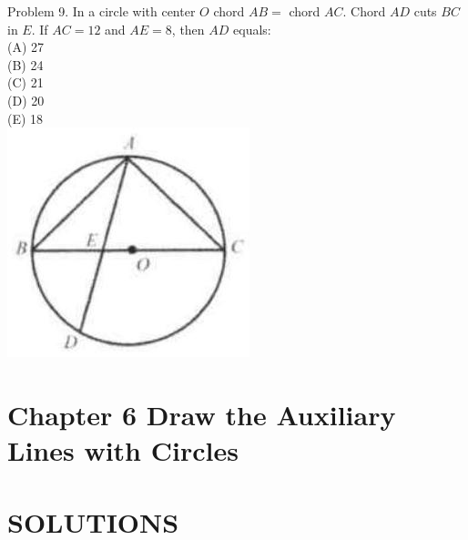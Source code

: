 \documentclass[10pt]{article}
\begin{document}
Problem 9. In a circle with center \(O\) chord \(A B=\) chord \(A C\). Chord \(A D\) cuts \(B C\) in \(E\). If \(A C=12\) and \(A E=8\), then \(A D\) equals:\\
(A) 27\\
(B) 24\\
(C) 21\\
(D) 20\\
(E) 18\\
\includegraphics[max width=\textwidth, center]{2025_04_17_97bc1f7e44d93c271a88g-170}

\section*{Chapter 6 Draw the Auxiliary Lines with Circles}
\section*{SOLUTIONS}
\end{document}

